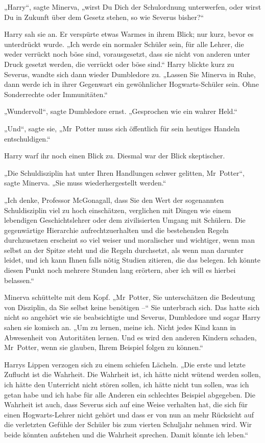 {„Harry“, sagte Minerva, „wirst Du Dich der Schulordnung unterwerfen, oder wirst Du in Zukunft über dem Gesetz stehen, so wie Severus bisher?“

Harry sah sie an. Er verspürte etwas Warmes in ihrem Blick; nur kurz, bevor es unterdrückt wurde. „Ich werde ein normaler Schüler sein, für alle Lehrer, die weder verrückt noch böse sind, vorausgesetzt, dass sie nicht von anderen unter Druck gesetzt werden, die verrückt oder böse sind.“ Harry blickte kurz zu Severus, wandte sich dann wieder Dumbledore zu. „Lassen Sie Minerva in Ruhe, dann werde ich in ihrer Gegenwart ein gewöhnlicher Hogwarts-Schüler sein. Ohne Sonderrechte oder Immunitäten.“

„Wundervoll“, sagte Dumbledore ernst. „Gesprochen wie ein wahrer Held.“

„Und“, sagte sie, „Mr~Potter muss sich öffentlich für sein heutiges Handeln entschuldigen.“

Harry warf ihr noch einen Blick zu. Diesmal war der Blick skeptischer.

„Die Schuldisziplin hat unter Ihren Handlungen schwer gelitten, Mr~Potter“, sagte Minerva. „Sie muss wiederhergestellt werden.“

„Ich denke, Professor McGonagall, dass Sie den Wert der sogenannten Schuldisziplin viel zu hoch einschätzen, verglichen mit Dingen wie einem lebendigen Geschichtslehrer oder dem zivilisierten Umgang mit Schülern. Die gegenwärtige Hierarchie aufrechtzuerhalten und die bestehenden Regeln durchzusetzen erscheint so viel weiser und moralischer und wichtiger, wenn man selbst an der Spitze steht und die Regeln durchsetzt, als wenn man darunter leidet, und ich kann Ihnen falls nötig Studien zitieren, die das belegen. Ich könnte diesen Punkt noch mehrere Stunden lang erörtern, aber ich will es hierbei belassen.“

Minerva schüttelte mit dem Kopf. „Mr~Potter, Sie unterschätzen die Bedeutung von Disziplin, da Sie selbst keine benötigen --“ Sie unterbrach sich. Das hatte sich nicht so angehört wie sie beabsichtigte und Severus, Dumbledore und sogar Harry sahen sie komisch an. „Um zu lernen, meine ich. Nicht jedes Kind kann in Abwesenheit von Autoritäten lernen. Und es wird den anderen Kindern schaden, Mr~Potter, wenn sie glauben, Ihrem Beispiel folgen zu können.“

Harrys Lippen verzogen sich zu einem schiefen Lächeln. „Die erste und letzte Zuflucht ist die Wahrheit. Die Wahrheit ist, ich hätte nicht wütend werden sollen, ich hätte den Unterricht nicht stören sollen, ich hätte nicht tun sollen, was ich getan habe und ich habe für alle Anderen ein schlechtes Beispiel abgegeben. Die Wahrheit ist auch, dass Severus sich auf eine Weise verhalten hat, die sich für einen Hogwarts-Lehrer nicht gehört und dass er von nun an mehr Rücksicht auf die verletzten Gefühle der Schüler bis zum vierten Schuljahr nehmen wird. Wir beide könnten aufstehen und die Wahrheit sprechen. Damit könnte ich leben.“

}
